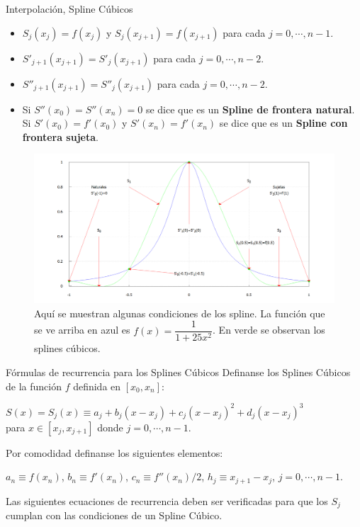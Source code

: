 \begin{frame}[allowframebreaks]{Interpolación, Spline Cúbicos}
\begin{itemize}
\item $S_j(x_j)=f(x_j)$ y $S_{j}(x_{j+1})=f(x_{j+1})$ para cada $j=0,\cdots, n-1$.
\item $S'_{j+1}(x_{j+1})=S'_{j}(x_{j+1})$ para cada $j=0,\cdots, n-2$.
\item $S''_{j+1}(x_{j+1})=S''_{j}(x_{j+1})$ para cada $j=0,\cdots, n-2$.
\item Si $S''(x_0)=S''(x_n)=0$ se dice que es un \textbf{Spline de frontera natural}. Si $S'(x_0)=f'(x_0)$ y $S'(x_n)=f'(x_n)$ se dice que es un \textbf{Spline con frontera sujeta}. 
\end{itemize}
\begin{figure}
\begin{center}
\includegraphics[scale=0.4]{Imagen22}
\end{center}
\caption{Aquí se muestran algunas condiciones de los spline. La función que se ve arriba en azul es $f(x)=\dfrac{1}{1+25x^2}$. En verde se observan los splines cúbicos.}
\end{figure}
\begin{block}{Fórmulas de recurrencia para los Splines Cúbicos}
\small
\indent Definanse los Splines Cúbicos de la función $f$ definida en $[x_0,x_n]$:
\begin{center}
$S(x)=S_j(x)\equiv a_j+b_j(x-x_j)+c_j(x-x_j)^2+d_j(x-x_j)^3$\\ para $x\in[x_j,x_{j+1}]$ donde $j=0,\cdots, n-1$.
\end{center}
\indent Por comodidad definanse los siguientes elementos:
\begin{center}
$a_n\equiv f(x_n)$, $b_n\equiv f'(x_n)$, $c_n\equiv f''(x_n)/2$, $h_j\equiv x_{j+1}-x_j$, $j=0,\cdots, n-1$.
\end{center}
\indent Las siguientes ecuaciones de recurrencia deben ser verificadas para que los $S_j$ cumplan con las condiciones de un Spline Cúbico.
\begin{enumerate}

\end{enumerate}
\end{block}
\end{frame}
